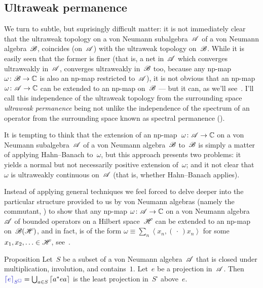 \documentclass[a]{subfiles}
\begin{document}
\subsection{Ultraweak permanence}
\begin{parsec}%
\begin{point}%
We turn to 
subtle, but suprisingly difficult matter:
it is not immediately clear
that the ultraweak topology on a von Neumann
subalgebra~$\mathscr{A}$ of a von Neumann algebra~$\mathscr{B}$,
coincides (on~$\mathscr{A}$) with the ultraweak topology on~$\mathscr{B}$.
While it is easily seen that the former is finer
(that is, a net in~$\mathscr{A}$ which converges ultraweakly in~$\mathscr{A}$,
converges ultraweakly in~$\mathscr{B}$ too, because any np-map 
$\omega\colon \mathscr{B}\to\mathbb{C}$ is also an np-map restricted to~$\mathscr{A}$),
it is not obvious that an np-map $\omega\colon \mathscr{A}\to\mathbb{C}$
can be extended to an np-map on~$\mathscr{B}$
--- but it can, as we'll see~.
I'll call this independence of the ultraweak topology
from the surrounding space
\emph{ultraweak permanence}
being not unlike the independence
of the spectrum of an operator from the surrounding space
known as spectral permanence ().


It is tempting to think that the extension of an np-map~$\omega\colon \mathscr{A}
\to\mathbb{C}$
on a von Neumann
subalgebra~$\mathscr{A}$ of a von Neumann algebra~$\mathscr{B}$
to~$\mathscr{B}$ is simply a matter of applying Hahn--Banach to~$\omega$,
but this approach presents two problems:
it yields a normal but not necessarily positive extension
of~$\omega$;
and it not clear that~$\omega$ is ultraweakly continuous
on~$\mathscr{A}$ (that is, whether Hahn--Banach applies).

Instead of applying general techniques we feel forced
to delve deeper
into the particular structure 
provided to us by von Neumann algebras
(namely the commutant, )
to show that any np-map
$\omega\colon \mathscr{A}\to\mathbb{C}$
on a von Neumann algebra~$\mathscr{A}$
of bounded operators on a Hilbert space~$\mathscr{H}$
can be extended to an np-map on~$\mathscr{B}(\mathscr{H})$,
and in fact, is of the form
$\omega\equiv \sum_n \left<x_n,(\,\cdot\,)x_n\right>$
for some $x_1,x_2,\dotsc \in\mathscr{H}$, see~.
\end{point}
\begin{point}{Proposition}%
Let~$S$ be a subset of a von Neumann algebra~$\mathscr{A}$
that is closed under multiplication, involution, and contains~$1$.
Let~$e$ be a projection in~$\mathscr{A}$.
Then $\Define{\ceil{e}_{S^\square}}= 
\bigcup_{a\in S} \ceil{a^* e a}$
is the least projection in~$S^\square$
above~$e$.


\end{point}
\end{parsec}
\end{document}
